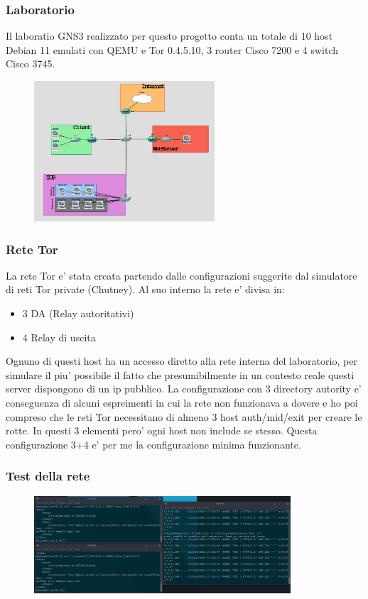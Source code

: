 \documentclass{beamer}[10pt]
\begin{document}
\begin{frame}
  \frametitle{Laboratorio}
  Il laboratio GNS3 realizzato per questo progetto conta un totale di 10 host Debian 11 emulati con QEMU e Tor 0.4.5.10, 3 router Cisco 7200 e 4 switch Cisco 3745.
  \begin{figure}
    \centering
    \includegraphics[width=0.60\textwidth]{../img/topology.png}
  \end{figure}

\end{frame}

\begin{frame}
  \frametitle{Rete Tor}
  La rete Tor e' stata creata partendo dalle configurazioni suggerite dal simulatore di reti Tor private (Chutney). Al suo interno la rete e' divisa in:
  \begin{itemize}
    \item 3 DA (Relay autoritativi)
    \item 4 Relay di uscita
  \end{itemize}
  Ognuno di questi host ha un accesso diretto alla rete interna del laboratorio, per simulare il piu' possibile il fatto che presumibilmente in un contesto reale questi server dispongono di un ip pubblico.
  La configurazione con 3 directory autority e' conseguenza di alcuni espreimenti in cui la rete non funzionava a dovere e ho poi compreso che le reti Tor necessitano di almeno 3 host auth/mid/exit per creare le rotte.
  In questi 3 elementi pero' ogni host non include se stesso. Questa configurazione 3+4 e' per me la configurazione minima funzionante.
\end{frame}


\begin{frame}
  \frametitle{Test della rete}
  \begin{figure}
    \centering
    \includegraphics[width=0.851\textwidth]{../img/terminali_2.png}
  \end{figure}
\end{frame}
\end{document}
